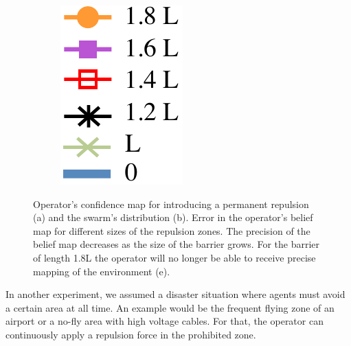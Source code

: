 \documentclass[runningheads]{llncs}%
\begin{document}
\begin{figure}
\begin{subfigure}{.09\textwidth}
        {\includegraphics[width=\textwidth]{figs/lines/maze_line}}     
        \vspace*{2em} 
    \end{subfigure}      
    \caption{Operator's confidence map for introducing a permanent repulsion (a) and the swarm's distribution (b). Error in the operator's belief map for different sizes of the repulsion zones. The precision of the belief map decreases as the size of the barrier grows. For the barrier of length 1.8L the operator will no longer be able to receive precise mapping of the environment (e).
    }
    \label{fig:permanent_command}
\end{figure}
    In another experiment, we assumed a disaster situation where agents must avoid a certain area at all time. An example would be the frequent flying zone of an airport or a no-fly area with high voltage cables. For that, the operator can continuously apply a repulsion force in the prohibited zone.
\end{document}
